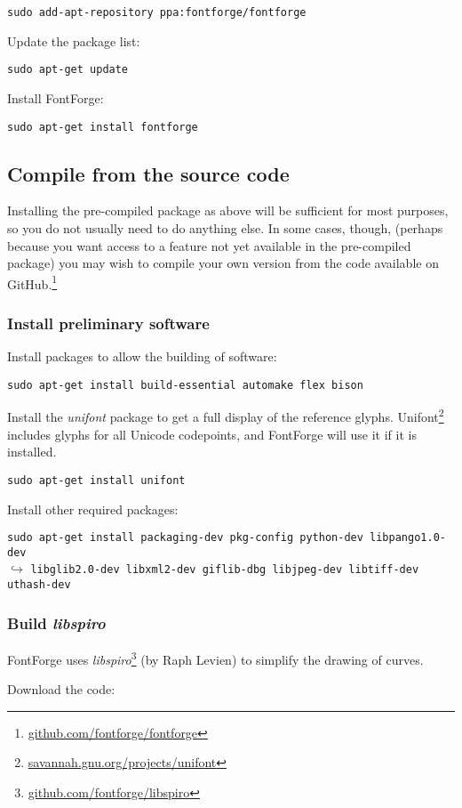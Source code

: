 \verb|sudo add-apt-repository ppa:fontforge/fontforge|

Update the package list:

\verb|sudo apt-get update|

Install FontForge:

\verb|sudo apt-get install fontforge|


\subsection{Compile from the source code}

Installing the pre-compiled package as above will be sufficient for most purposes, so you do not usually need to do anything else.  In some cases, though, (perhaps because you want access to a feature not yet available in the pre-compiled package) you may wish to compile your own version from the code available on GitHub.\footnote{\url{github.com/fontforge/fontforge}}

\subsubsection{Install preliminary software}

Install packages to allow the building of software:

\verb|sudo apt-get install build-essential automake flex bison|

Install the \textit{unifont} package to get a full display of the reference glyphs.  Unifont\footnote{\url{savannah.gnu.org/projects/unifont}} includes glyphs for all Unicode codepoints, and FontForge will use it if it is installed.

\verb|sudo apt-get install unifont|

Install other required packages: 

\verb|sudo apt-get install packaging-dev pkg-config python-dev libpango1.0-dev|\\
$\hookrightarrow$ \verb|libglib2.0-dev libxml2-dev giflib-dbg libjpeg-dev libtiff-dev uthash-dev|

\subsubsection{Build \textit{libspiro}}

FontForge uses \textit{libspiro}\footnote{\url{github.com/fontforge/libspiro}} (by Raph Levien) to simplify the drawing of curves.

Download the code:

